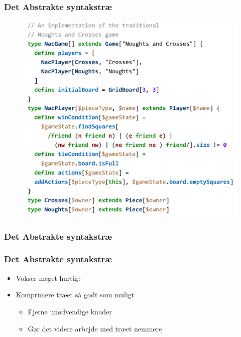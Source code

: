\begin{frame}
  \frametitle{Det Abstrakte syntakstræ}

  \begin{figure}
    \includegraphics[width=0.6\linewidth]{billeder/krydsogbolle}
  \end{figure}
\end{frame}

\begin{frame}
  \frametitle{Det Abstrakte syntakstræ}
 
  
  
  
\end{frame}

\begin{frame}
  \frametitle{Det Abstrakte syntakstræ}

  \begin{itemize}
    \item Vokser meget hurtigt
    \item Komprimere træet så godt som muligt
      \begin{itemize}
        \item Fjerne unødvendige knuder
        \item Gør det videre arbejde med træet nemmere
      \end{itemize}
  \end{itemize}
\end{frame}

